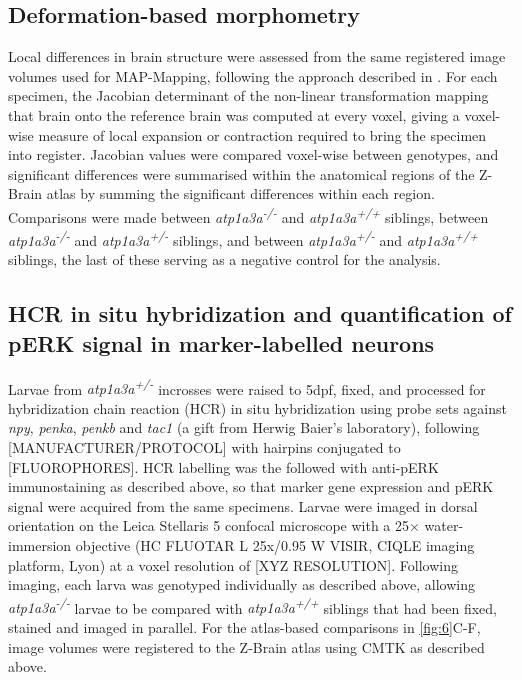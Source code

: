 \documentclass[9.5pt,lineno]{RandlettLab_elife}
\begin{document}
\subsection{Deformation-based morphometry}
Local differences in brain structure were assessed from the same registered image volumes used for MAP-Mapping, following the approach described in \citet{Randlett2015}.
For each specimen, the Jacobian determinant of the non-linear transformation mapping that brain onto the reference brain was computed at every voxel, giving a voxel-wise measure of local expansion or contraction required to bring the specimen into register.
Jacobian values were compared voxel-wise between genotypes, and significant differences were summarised within the anatomical regions of the Z-Brain atlas \citep{Randlett2015} by summing the significant differences within each region.
Comparisons were made between \emph{atp1a3a\textsuperscript{-/-}} and \emph{atp1a3a\textsuperscript{+/+}} siblings, between \emph{atp1a3a\textsuperscript{-/-}} and \emph{atp1a3a\textsuperscript{+/-}} siblings, and between \emph{atp1a3a\textsuperscript{+/-}} and \emph{atp1a3a\textsuperscript{+/+}} siblings, the last of these serving as a negative control for the analysis.

\subsection{HCR in situ hybridization and quantification of pERK signal in marker-labelled neurons}
Larvae from \emph{atp1a3a\textsuperscript{+/-}} incrosses were raised to 5dpf, fixed, and processed for hybridization chain reaction (HCR) in situ hybridization \citep{Choi2018} using probe sets against \emph{npy}, \emph{penka}, \emph{penkb} and \emph{tac1} (a gift from Herwig Baier's laboratory), following [MANUFACTURER/PROTOCOL] with hairpins conjugated to [FLUOROPHORES].
HCR labelling was the followed with anti-pERK immunostaining as described above, so that marker gene expression and pERK signal were acquired from the same specimens.
Larvae were imaged in dorsal orientation on the Leica Stellaris 5 confocal microscope with a 25$\times$ water-immersion objective (HC FLUOTAR L 25x/0.95 W VISIR, CIQLE imaging platform, Lyon) at a voxel resolution of [XYZ RESOLUTION].
Following imaging, each larva was genotyped individually as described above, allowing \emph{atp1a3a\textsuperscript{-/-}} larvae to be compared with \emph{atp1a3a\textsuperscript{+/+}} siblings that had been fixed, stained and imaged in parallel.
For the atlas-based comparisons in \autoref{fig:6}C-F, image volumes were registered to the Z-Brain atlas \citep{Randlett2015} using CMTK as described above.
\end{document}
